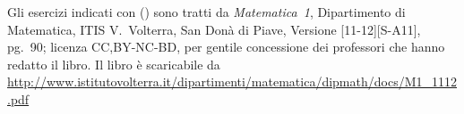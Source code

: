 Gli esercizi indicati con (\croce) sono tratti da \emph{Matematica~1}, 
Dipartimento di Matematica, ITIS V.~Volterra, San Donà di Piave, Versione 
[11-12][S-A11], pg.~90;
licenza CC,BY-NC-BD, per gentile concessione dei professori che hanno redatto 
il 
libro.
Il libro è scaricabile da 
\url{
http://www.istitutovolterra.it/dipartimenti/matematica/dipmath/docs/M1_1112.pdf}


\subsubsection*{}

